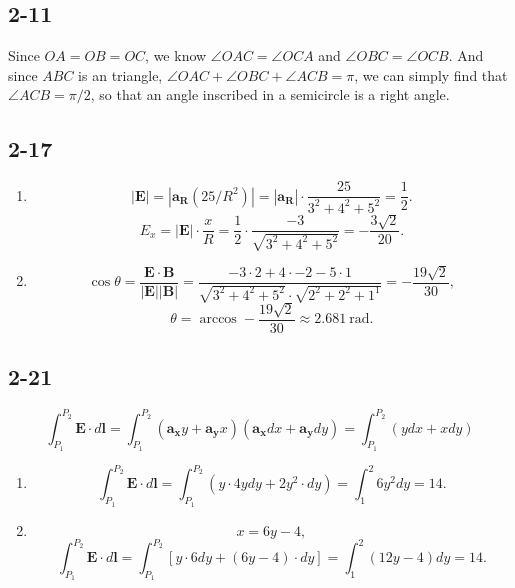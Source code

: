 \documentclass[11pt,a4paper]{article}
\author{\href{liuyh615@sjtu.edu.cn}{Yihao Liu} (515370910207)}
\subtitle{Homework}
\begin{document}
\maketitle

\subsection{2-11}
\begin{center}
\end{center}

Since $OA=OB=OC$, we know $\angle OAC=\angle OCA$ and $\angle OBC=\angle OCB$. And since $ABC$ is an triangle, $\angle OAC+\angle OBC+\angle ACB=\pi$, we can simply find that $\angle ACB=\pi/2$, so that an angle inscribed in a semicircle is a right angle.

\subsection{2-17}
\begin{enumerate}[label=\alph*)]
\item 
$$|\mathbf{E}|=|\mathbf{a_R}(25/R^2)|=|\mathbf{a_R}|\cdot\frac{25}{3^2+4^2+5^2}=\frac{1}{2}.$$
$$E_x=|\mathbf{E}|\cdot\frac{x}{R}=\frac{1}{2}\cdot\frac{-3}{\sqrt{3^2+4^2+5^2}}=-\frac{3\sqrt{2}}{20}.$$
\item
$$\cos\theta=\frac{\mathbf{E}\cdot\mathbf{B}}{|\mathbf{E}||\mathbf{B}|}=\frac{-3\cdot2+4\cdot-2-5\cdot1}{\sqrt{3^2+4^2+5^2}\cdot\sqrt{2^2+2^2+1^1}}=-\frac{19\sqrt{2}}{30},$$
$$\theta=\arccos-\frac{19\sqrt{2}}{30}\approx \SI{2.681}{\radian}.$$
\end{enumerate}

\subsection{2-21}
$$\int_{P_1}^{P_2}\mathbf{E}\cdot d\mathbf{l}=\int_{P_1}^{P_2}(\mathbf{a_x}y+\mathbf{a_y}x)(\mathbf{a_x}dx+\mathbf{a_y}dy)=\int_{P_1}^{P_2}(ydx+xdy)$$
\begin{enumerate}[label=\alph*)]
\item
$$\int_{P_1}^{P_2}\mathbf{E}\cdot d\mathbf{l}=\int_{P_1}^{P_2}(y\cdot4ydy+2y^2\cdot dy)=\int_1^2 6y^2dy=14.$$
\item
$$x=6y-4,$$
$$\int_{P_1}^{P_2}\mathbf{E}\cdot d\mathbf{l}=\int_{P_1}^{P_2}[y\cdot6dy+(6y-4)\cdot dy]=\int_1^2 (12y-4)dy=14.$$
\end{enumerate}
\end{document}
